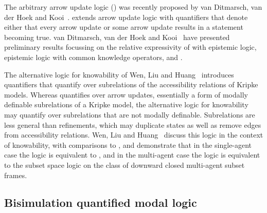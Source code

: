 The arbitrary arrow update logic (\logicAaul{}) was recently proposed by van Ditmarsch, van der Hoek and Kooi~\cite{vanditmarsch:2014}.
\logicAaul{} extends arrow update logic with quantifiers that denote either that every arrow update or some arrow update results in a statement becoming true. 
van Ditmarsch, van der Hoek and Kooi~\cite{vanditmarsch:2014} have presented preliminary results focussing on the relative expressivity of \logicAaul{} with epistemic logic, epistemic logic with common knowledge operators, and \logicApal{}.

The alternative logic for knowability of Wen, Liu and Huang~\cite{wen:2011} introduces quantifiers that quantify over subrelations of the accessibility relations of Kripke models.
Whereas \logicAaul{} quantifies over arrow updates, essentially a form of modally definable subrelations of a Kripke model, the alternative logic for knowability may quantify over subrelations that are not modally definable.
Subrelations are less general than refinements, which may duplicate states as well as remove edges from accessibility relations.
Wen, Liu and Huang~\cite{wen:2011} discuss this logic in the context of knowability, with comparisons to \logicApal{}, and demonstrate that in the single-agent case the logic is equivalent to \logicApal{}, and in the multi-agent case the logic is equivalent to the subset space logic on the class of downward closed multi-agent subset frames.


\subsection{Bisimulation quantified modal logic}

